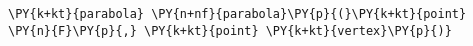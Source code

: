 \begin{Verbatim}[commandchars=\\\{\}]
    \PY{k+kt}{parabola} \PY{n+nf}{parabola}\PY{p}{(}\PY{k+kt}{point} \PY{n}{F}\PY{p}{,} \PY{k+kt}{point} \PY{k+kt}{vertex}\PY{p}{)}
\end{Verbatim}
